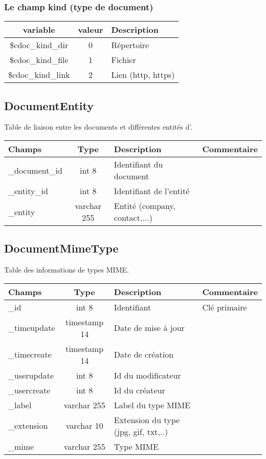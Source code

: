\subsubsection{Le champ kind (type de document)}

\begin{tabular}{|c|c|l|}
\hline
\textbf{variable} & \textbf{valeur} & \textbf{Description}\\
\hline
\$cdoc\_kind\_dir & 0 & Répertoire \\
\hline
\$cdoc\_kind\_file & 1 & Fichier \\
\hline
\$cdoc\_kind\_link & 2 & Lien (http, https) \\
\hline
\end{tabular}


\subsection{DocumentEntity}

Table de liaison entre les documents et différentes entités d'\obm.\\

\begin{tabular}{|p{3cm}|c|p{5.4cm}|p{2.6cm}|}
\hline
\textbf{Champs} & \textbf{Type} & \textbf{Description} & \textbf{Commentaire} \\
\hline
\_document\_id & int 8 & Identifiant du document & \\
\hline
\_entity\_id & int 8 & Identifiant de l'entité & \\
\hline
\_entity & varchar 255 & Entité (company, contact,...) & \\
\hline
\end{tabular}


\subsection{DocumentMimeType}
Table des informations de types MIME.\\

\begin{tabular}{|p{3cm}|c|p{5.4cm}|p{2.6cm}|}
\hline
\textbf{Champs} & \textbf{Type} & \textbf{Description} & \textbf{Commentaire} \\
\hline
\_id & int 8 & Identifiant & Clé primaire \\
\hline
\_timeupdate & timestamp 14 & Date de mise à jour & \\
\hline
\_timecreate & timestamp 14 & Date de création & \\
\hline
\_userupdate & int 8 & Id du modificateur & \\
\hline
\_usercreate & int 8 & Id du créateur & \\
\hline
\_label & varchar 255 & Label du type MIME & \\
\hline
\_extension & varchar 10 & Extension du type (jpg, gif, txt,..) & \\
\hline
\_mime & varchar 255 & Type MIME \\
\hline
\end{tabular}


